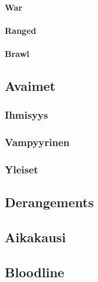 \documentclass[a4paper, 12pt, finnish]{article}
\begin{document}
{			\paragraph{War}
			\paragraph{Ranged}
			\paragraph{Brawl}
	\subsection{Avaimet}
		\subsubsection{Ihmisyys}
		\subsubsection{Vampyyrinen}
		\subsubsection{Yleiset}
	\subsection{Derangements}
	\subsection{Aikakausi}
	\subsection{Bloodline}
}
\end{document}
